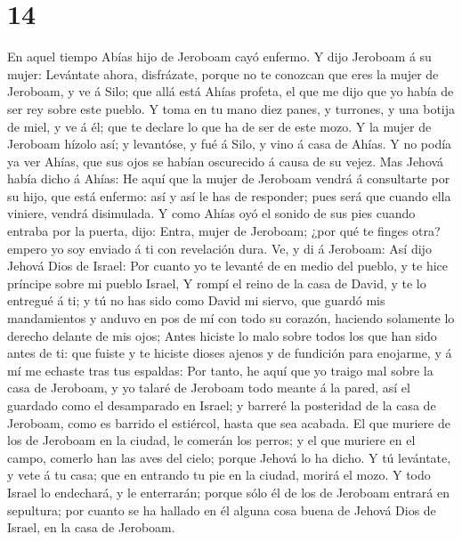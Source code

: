 \hypertarget{section-13}{%
\section{14}\label{section-13}}

 En aquel tiempo Abías hijo de Jeroboam cayó enfermo.
 Y dijo Jeroboam á su mujer: Levántate ahora, disfrázate,
porque no te conozcan que eres la mujer de Jeroboam, y ve á Silo; que
allá está Ahías profeta, el que me dijo que yo había de ser rey sobre
este pueblo.  Y toma en tu mano diez panes, y turrones, y
una botija de miel, y ve á él; que te declare lo que ha de ser de este
mozo.  Y la mujer de Jeroboam hízolo así; y levantóse, y
fué á Silo, y vino á casa de Ahías. Y no podía ya ver Ahías, que sus
ojos se habían oscurecido á causa de su vejez.  Mas Jehová
había dicho á Ahías: He aquí que la mujer de Jeroboam vendrá á
consultarte por su hijo, que está enfermo: así y así le has de
responder; pues será que cuando ella viniere, vendrá disimulada.
 Y como Ahías oyó el sonido de sus pies cuando entraba por
la puerta, dijo: Entra, mujer de Jeroboam; ¿por qué te finges otra?
empero yo soy enviado á ti con revelación dura.  Ve, y di
á Jeroboam: Así dijo Jehová Dios de Israel: Por cuanto yo te levanté de
en medio del pueblo, y te hice príncipe sobre mi pueblo Israel,
 Y rompí el reino de la casa de David, y te lo entregué á
ti; y tú no has sido como David mi siervo, que guardó mis mandamientos y
anduvo en pos de mí con todo su corazón, haciendo solamente lo derecho
delante de mis ojos;  Antes hiciste lo malo sobre todos
los que han sido antes de ti: que fuiste y te hiciste dioses ajenos y de
fundición para enojarme, y á mí me echaste tras tus espaldas:
 Por tanto, he aquí que yo traigo mal sobre la casa de
Jeroboam, y yo talaré de Jeroboam todo meante á la pared, así el
guardado como el desamparado en Israel; y barreré la posteridad de la
casa de Jeroboam, como es barrido el estiércol, hasta que sea acabada.
 El que muriere de los de Jeroboam en la ciudad, le
comerán los perros; y el que muriere en el campo, comerlo han las aves
del cielo; porque Jehová lo ha dicho.  Y tú levántate, y
vete á tu casa; que en entrando tu pie en la ciudad, morirá el mozo.
 Y todo Israel lo endechará, y le enterrarán; porque sólo
él de los de Jeroboam entrará en sepultura; por cuanto se ha hallado en
él alguna cosa buena de Jehová Dios de Israel, en la casa de Jeroboam.
